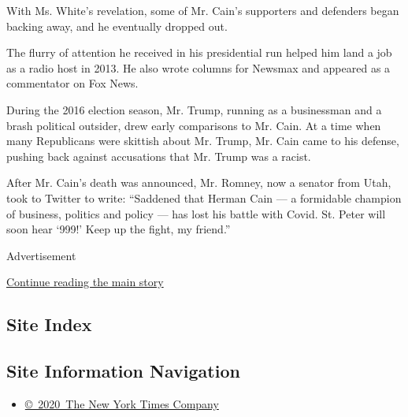 With Ms. White's revelation, some of Mr. Cain's supporters and defenders
began backing away, and he eventually dropped out.

The flurry of attention he received in his presidential run helped him
land a job as a radio host in 2013. He also wrote columns for Newsmax
and appeared as a commentator on Fox News.

During the 2016 election season, Mr. Trump, running as a businessman and
a brash political outsider, drew early comparisons to Mr. Cain. At a
time when many Republicans were skittish about Mr. Trump, Mr. Cain came
to his defense, pushing back against accusations that Mr. Trump was a
racist.

After Mr. Cain's death was announced, Mr. Romney, now a senator from
Utah, took to Twitter to write: ``Saddened that Herman Cain --- a
formidable champion of business, politics and policy --- has lost his
battle with Covid. St. Peter will soon hear `999!' Keep up the fight, my
friend.''

Advertisement

\protect\hyperlink{after-bottom}{Continue reading the main story}

\hypertarget{site-index}{%
\subsection{Site Index}\label{site-index}}

\hypertarget{site-information-navigation}{%
\subsection{Site Information
Navigation}\label{site-information-navigation}}

\begin{itemize}
\tightlist
\item
  \href{https://help.nytimes3xbfgragh.onion/hc/en-us/articles/115014792127-Copyright-notice}{©~2020~The
  New York Times Company}
\end{itemize}

